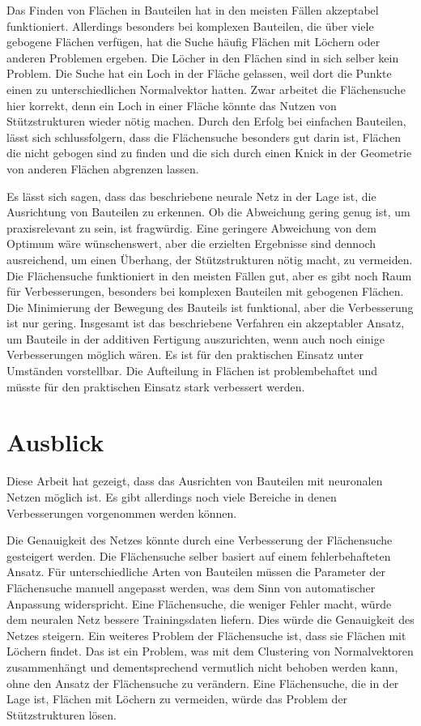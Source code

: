 \smallskip

Das Finden von Flächen in Bauteilen hat in den meisten Fällen akzeptabel funktioniert. Allerdings besonders bei komplexen Bauteilen, die über viele gebogene Flächen verfügen, hat die Suche häufig Flächen mit Löchern oder anderen Problemen ergeben. 
Die Löcher in den Flächen sind in sich selber kein Problem. Die Suche hat ein Loch in der Fläche gelassen, weil dort die Punkte einen zu unterschiedlichen Normalvektor hatten. Zwar arbeitet die Flächensuche hier korrekt, 
denn ein Loch in einer Fläche könnte das Nutzen von Stützstrukturen wieder nötig machen.
Durch den Erfolg bei einfachen Bauteilen, lässt sich schlussfolgern, dass die Flächensuche besonders gut darin ist, Flächen die nicht gebogen sind zu finden und die sich durch einen Knick in der Geometrie von anderen Flächen abgrenzen lassen. 

\smallskip

Es lässt sich sagen, dass das beschriebene neurale Netz in der Lage ist, die Ausrichtung von Bauteilen zu erkennen. Ob die Abweichung gering genug ist, um praxisrelevant zu sein, ist fragwürdig.  Eine geringere Abweichung von dem Optimum wäre wünschenswert, 
aber die erzielten Ergebnisse sind dennoch ausreichend, 
um einen Überhang, der Stützstrukturen nötig macht, zu vermeiden. Die Flächensuche funktioniert in den meisten Fällen gut, aber es gibt noch Raum für Verbesserungen, besonders bei komplexen Bauteilen mit gebogenen Flächen. Die Minimierung der Bewegung des Bauteils ist funktional, 
aber die Verbesserung ist nur gering. Insgesamt ist das beschriebene Verfahren ein akzeptabler Ansatz, um Bauteile in der additiven Fertigung auszurichten, wenn auch noch einige Verbesserungen möglich wären. 
Es ist für den praktischen Einsatz unter Umständen vorstellbar. Die Aufteilung in Flächen ist problembehaftet und müsste für den praktischen Einsatz stark verbessert werden.

\section{Ausblick}
\label{Ausblick}

Diese Arbeit hat gezeigt, dass das Ausrichten von Bauteilen mit neuronalen Netzen möglich ist. Es gibt allerdings noch viele Bereiche in denen Verbesserungen vorgenommen werden können.

\smallskip 

Die Genauigkeit des Netzes könnte durch eine Verbesserung der Flächensuche gesteigert werden. Die Flächensuche selber basiert auf einem fehlerbehafteten Ansatz. Für unterschiedliche Arten von Bauteilen müssen die Parameter der Flächensuche manuell angepasst werden, 
was dem Sinn von automatischer Anpassung widerspricht. Eine Flächensuche, die weniger Fehler macht, würde dem neuralen Netz bessere Trainingsdaten liefern. Dies würde die Genauigkeit des Netzes steigern. Ein weiteres Problem der Flächensuche ist, dass sie Flächen mit Löchern findet.
Das ist ein Problem, was mit dem Clustering von Normalvektoren zusammenhängt und dementsprechend vermutlich nicht behoben werden kann, ohne den Ansatz der Flächensuche zu verändern. Eine Flächensuche, die in der Lage ist, Flächen mit Löchern zu vermeiden, 
würde das Problem der Stützstrukturen lösen.


